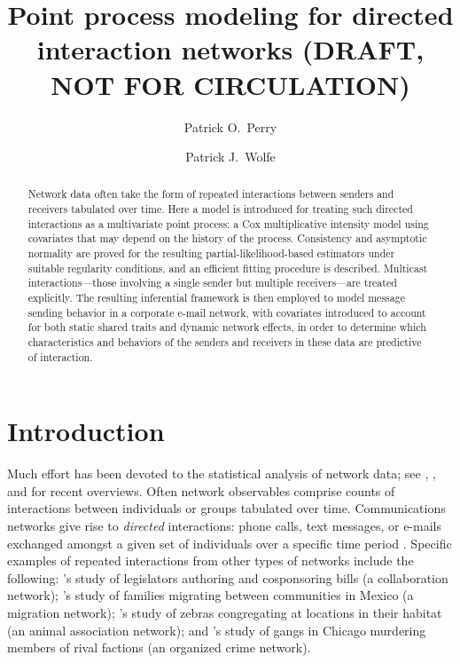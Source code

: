 \documentclass[final]{statsoc}
\title[Point Process Modeling for Directed Interaction Networks]{%
    Point process modeling for directed interaction networks (DRAFT, NOT FOR
CIRCULATION)
}
\author[P.\ O.\ Perry]{%
    Patrick O.\ Perry
}
\author[P.\ J.\ Wolfe]{%
    Patrick J.\ Wolfe
}
\begin{document}

\begin{abstract}
Network data often take the form of repeated interactions between senders
and receivers tabulated over time.  Here a model is introduced for treating such directed interactions as a
multivariate point process: a Cox multiplicative intensity model using
covariates that may depend on the history of the process.
Consistency and asymptotic normality are proved for the resulting
partial-likelihood-based estimators under suitable regularity
conditions, and an efficient fitting procedure is described.
Multicast interactions---those involving a single sender
but multiple receivers---are treated explicitly.
The resulting inferential framework is then employed to model message sending behavior in a corporate e-mail network, with covariates introduced to account for both static shared traits and dynamic network effects, in order to determine which characteristics and behaviors of the senders and receivers in these data are predictive of interaction.


\end{abstract}


\section{Introduction}
\label{S:introduction}

Much effort has been devoted to the statistical analysis of network data;
see \citet{jackson2008social}, \citet{goldenberg2009survey}, and \citet{kolaczyk2009statistical}
for recent overviews.  Often network observables comprise counts of interactions
between individuals or groups tabulated over time.  Communications networks
give rise to \emph{directed} interactions: phone calls, text messages, or
e-mails exchanged amongst a given set of individuals over a specific time
period \citep{tyler2005email,eagle2006reality}.  Specific examples of repeated
interactions from other types of networks include the following:
's \citeyearpar{fowler2006connecting}
study of legislators authoring and cosponsoring bills (a collaboration
network);
's \citeyearpar{mckenzie2007network} study
of families migrating between communities in Mexico (a migration network);
's \citeyearpar{sundaresan2007network}
study of zebras congregating at locations in
their habitat (an animal association network);
and 's \citeyearpar{papachristos2009murder}
study of gangs in Chicago murdering members of rival factions (an organized
crime network).
\end{document}
